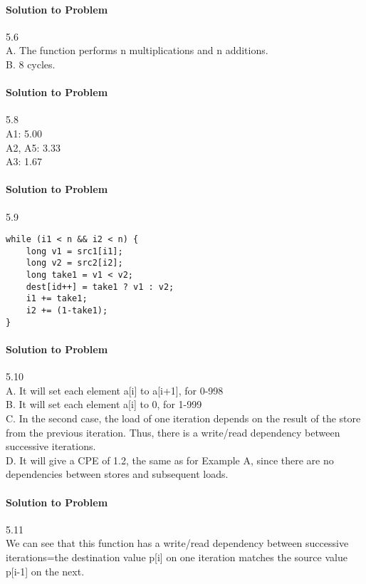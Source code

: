 \documentclass{report}
\begin{document}
\paragraph{Solution to Problem } 5.6\\
A. The function performs n multiplications and n additions. \\
B. 8 cycles.

\paragraph{Solution to Problem } 5.8\\
A1: 5.00 \\
A2, A5: 3.33 \\
A3: 1.67

\paragraph{Solution to Problem } 5.9\\
\begin{lstlisting}
while (i1 < n && i2 < n) {
    long v1 = src1[i1];
    long v2 = src2[i2];
    long take1 = v1 < v2;
    dest[id++] = take1 ? v1 : v2;
    i1 += take1;
    i2 += (1-take1);
}
\end{lstlisting}

\paragraph{Solution to Problem } 5.10\\
A. It will set each element a[i] to a[i+1], for 0-998 \\
B. It will set each element a[i] to 0, for 1-999 \\
C. In the second case, the load of one iteration depends on the result of the store from the previous iteration. Thus, there is a write/read dependency between successive iterations. \\
D. It will give a CPE of 1.2, the same as for Example A, since there are no dependencies between stores and subsequent loads. 

\paragraph{Solution to Problem } 5.11\\
We can see that this function has a write/read dependency between successive iterations=the destination value p[i] on one iteration matches the source value p[i-1] on the next.
\end{document}
